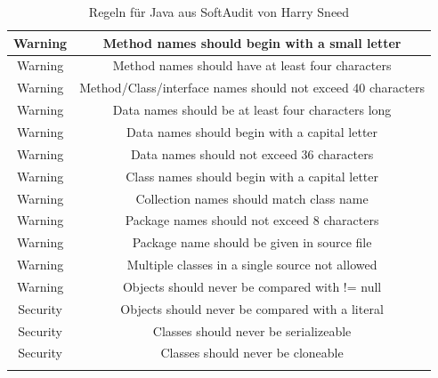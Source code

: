 \documentclass[da,ngerman]{stthesis}
\begin{document}
\begin{center}
\begin{longtabu}{|c|c|}
						\hline
						Warning & Method names should begin with a small letter \\
						\hline
						Warning & Method names should have at least four characters \\
						\hline
						Warning & Method/Class/interface names should not exceed 40 characters \\
						\hline
						Warning & Data names should be at least four characters long \\
						\hline
						Warning & Data names should begin with a capital letter \\
						\hline
						Warning & Data names should not exceed 36 characters \\
						\hline
						Warning & Class names should begin with a capital letter \\
						\hline
						Warning & Collection names should match class name \\
						\hline
						Warning & Package names should not exceed 8 characters \\
						\hline
						Warning & Package name should be given in source file \\
						\hline
						Warning & Multiple classes in a single source not allowed \\
						\hline
						Warning & Objects should never be compared with != null \\
						\hline
						Security & Objects should never be compared with a literal \\
						\hline
						Security & Classes should never be serializeable \\
						\hline
						Security & Classes should never be cloneable \\
  						\hline
  						\caption{Regeln für Java aus SoftAudit von Harry Sneed \cite{SoftAuditDoku}}
						\label{softauditrules}
  					\end{longtabu}   
  				\end{center}
\end{document}
